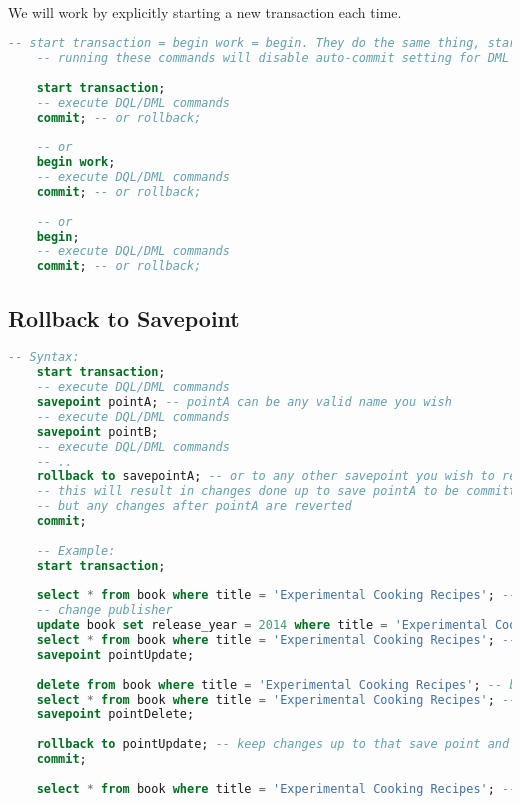 \paragraph{} We will work by explicitly starting a new transaction each time.
\begin{lstlisting}[language=SQL]
	-- start transaction = begin work = begin. They do the same thing, start a new transaction
	-- running these commands will disable auto-commit setting for DML commands if it's enabled, until transaction is completed (by commit/rollback or implicit commit)
	
	start transaction;
	-- execute DQL/DML commands
	commit; -- or rollback;
	
	-- or
	begin work;
	-- execute DQL/DML commands
	commit; -- or rollback;
	
	-- or
	begin;
	-- execute DQL/DML commands
	commit; -- or rollback;
\end{lstlisting}
\subsection{Rollback to Savepoint}
\begin{lstlisting}[language=SQL]
	-- Syntax:
	start transaction;
	-- execute DQL/DML commands
	savepoint pointA; -- pointA can be any valid name you wish
	-- execute DQL/DML commands
	savepoint pointB;
	-- execute DQL/DML commands
	-- ..
	rollback to savepointA; -- or to any other savepoint you wish to revert to
	-- this will result in changes done up to save pointA to be committed
	-- but any changes after pointA are reverted
	commit;
	
	-- Example:
	start transaction;
	
	select * from book where title = 'Experimental Cooking Recipes'; -- we have this book from before
	-- change publisher
	update book set release_year = 2014 where title = 'Experimental Cooking Recipes';
	select * from book where title = 'Experimental Cooking Recipes'; -- see updated release year
	savepoint pointUpdate;
	
	delete from book where title = 'Experimental Cooking Recipes'; -- book is deleted
	select * from book where title = 'Experimental Cooking Recipes'; -- no such book
	savepoint pointDelete;
	
	rollback to pointUpdate; -- keep changes up to that save point and revert anything done below that point
	commit;
	
	select * from book where title = 'Experimental Cooking Recipes'; -- book will be there with updated release year
\end{lstlisting}
